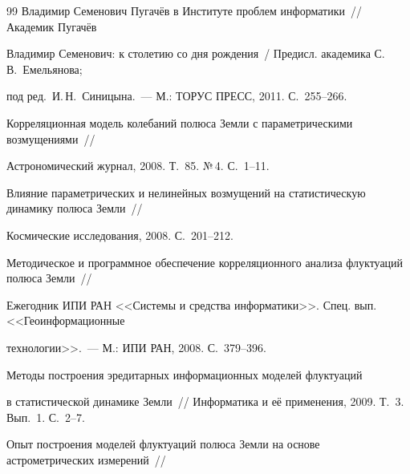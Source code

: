 {{\begin{thebibliography}{99}
Владимир Семенович Пугачёв в Институте проблем информатики~/\!\!/ Академик Пугачёв 


Владимир Семенович: к столетию со дня рождения~/ Предисл. академика С.\,В.~Емельянова; 


под ред.\ И.\,Н.~Синицына.~--- М.: ТОРУС ПРЕСС, 2011. С.~255--266.









Корреляционная модель колебаний полюса Земли с параметрическими возмущениями~/\!\!/ 


Астрономический журнал, 2008. Т.~85. №\,4. С.~1--11.









Влияние параметрических и нелинейных возмущений на статистическую динамику полюса Земли~/\!\!/ 


Космические исследования, 2008. С.~201--212.









Методическое и программное обеспечение корреляционного анализа флуктуаций полюса Земли~/\!\!/ 


Ежегодник ИПИ РАН <<Системы и средства информатики>>. Спец. вып. <<Геоинформационные 


технологии>>.~--- М.: ИПИ РАН, 2008. С.~379--396.







 Методы построения эредитарных информационных моделей флуктуаций 


в статистической динамике Земли~/\!\!/ Информатика и её применения, 2009. Т.~3. Вып.~1. С.~2--7.









Опыт построения моделей флуктуаций полюса Земли на основе астрометрических измерений~/\!\!/ 



\end{thebibliography}}}
